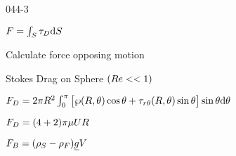 \begin{mitframe}{044-3}
\begin{listone}
	\item $\force=\int_{\entropy}\torque_{\elecdisplace}\mathrm{d}\entropy$
    		\begin{listtwo}
            	\item Calculate force opposing motion
                \item Stokes Drag on Sphere $(\reynolds<<1)$
                		\begin{listthree}
                        		\item $\force_{\elecdisplace}=2\pi\gasconst^2\int_0^{\pi}\big[\dynpress(\gasconst,\theta)\cos\theta+\torque_{\pos\theta}(\gasconst,\theta)\sin\theta\big]\sin\theta\mathrm{d}\theta$
                                \item $\force_{\elecdisplace}=(4+2)\pi\chempot\uvel\gasconst$
                        \end{listthree}
            \end{listtwo}
    \item $\bodyforce=(\dens_{\entropy}-\dens_{\force})\uline{\grav}\vol$
\end{listone}        

\end{mitframe}
